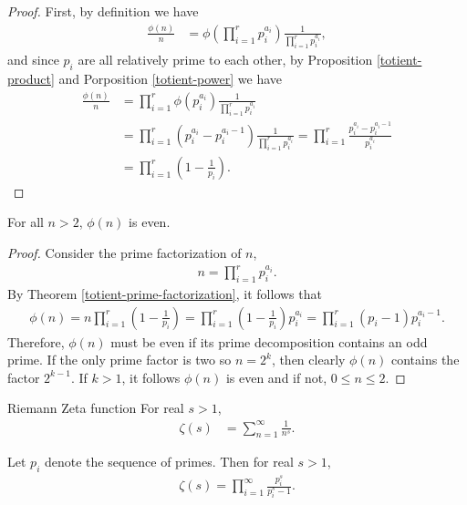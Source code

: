 \begin{proof}
    First, by definition we have
    \begin{align*}
        \frac{\phi(n)}{n} &= \phi\left(\prod_{i=1}^{r}p_i^{a_i}\right)\frac{1}{\prod_{i=1}^{r}p_i^{a_i}},
    \end{align*}
    and since $p_i$ are all relatively prime to each other, by Proposition \ref{totient-product} and Porposition \ref{totient-power} we have
    \begin{align*}
        \frac{\phi(n)}{n} &= \prod_{i=1}^{r}\phi\left(p_i^{a_i}\right)\frac{1}{\prod_{i=1}^{r}p_i^{a_i}} \\
        &= \prod_{i=1}^{r}(p_i^{a_i}-p_i^{a_i-1})\frac{1}{\prod_{i=1}^{r}p_i^{a_i}} = \prod_{i=1}^{r}\frac{p_i^{a_i} - p_i^{a_i-1}}{p_i^{a_i}} \\
        &= \prod_{i=1}^{r}\left(1 - \frac{1}{p_i}\right).
    \end{align*}
\end{proof}

\begin{prop}
    For all $n > 2$, $\phi(n)$ is even.
\end{prop}

\begin{proof}
    Consider the prime factorization of $n$,
    \begin{align*}
        n = \prod_{i=1}^{r}p_i^{a_i}.
    \end{align*}
    By Theorem \ref{totient-prime-factorization}, it follows that
    \begin{align*}
        \phi(n) = n\prod_{i=1}^{r}\left(1 - \frac{1}{p_i}\right) = \prod_{i=1}^{r}\left(1 - \frac{1}{p_i}\right)p_i^{a_i} = \prod_{i=1}^{r}\left(p_i - 1\right)p_i^{a_i-1}.
    \end{align*}
    Therefore, $\phi(n)$ must be even if its prime decomposition contains an odd prime. If the only prime factor is two so $n = 2^{k}$, then clearly $\phi(n)$ contains the factor $2^{k-1}$. If $k > 1$, it follows $\phi(n)$ is even and if not, $0 \leq n \leq 2$.
\end{proof}

\begin{defn}{Riemann Zeta function}\proofbreak
    For real $s > 1$,
    \begin{align*}
        \zeta(s) &= \sum_{n=1}^{\infty}\frac{1}{n^s}.
    \end{align*}
\end{defn}

\begin{lemma}\label{zeta_product}
    Let $p_i$ denote the sequence of primes. Then for real $s > 1$,
    \begin{align*}
        \zeta(s) = \prod_{i=1}^{\infty}\frac{p_i^s}{p_i^s - 1}.
    \end{align*}
\end{lemma}


